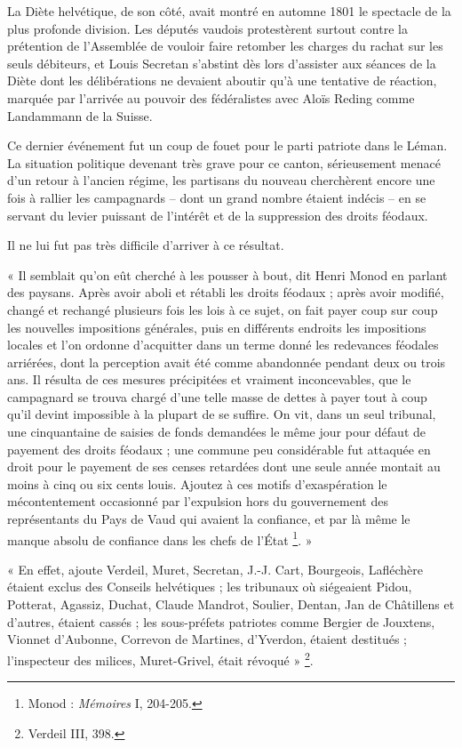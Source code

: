 \documentclass[french,twoside]{book} %
\newenvironment{quoteblock}%
  {\begin{quoting}}
  {\end{quoting}}
\newenvironment{quotebar}{%
    \def\FrameCommand{{\color{rubric!10!}\vrule width 0.5em} \hspace{0.9em}}%
    \def\OuterFrameSep{\itemsep} %
    \MakeFramed {\advance\hsize-\width \FrameRestore}
  }%
  {%
    \endMakeFramed
  }
\renewenvironment{quoteblock}%
  {%
    \savenotes
    \setstretch{0.9}
    \begin{quotebar}
  }
  {%
    \end{quotebar}
    \spewnotes
  }
\begin{document}
\noindent La Diète helvétique, de son côté, avait montré en automne 1801 le spectacle de la plus profonde division. Les députés vaudois protestèrent surtout contre la prétention de l’Assemblée de vouloir faire retomber les charges du rachat sur les seuls débiteurs, et Louis Secretan s’abstint dès lors d’assister aux séances de la Diète dont les délibérations ne devaient aboutir qu’à une tentative de réaction, marquée par l’arrivée au pouvoir des fédéralistes avec Aloïs Reding comme Landammann de la Suisse.\par
Ce dernier événement fut un coup de fouet pour le parti patriote dans le Léman. La situation politique devenant très grave pour ce canton, sérieusement menacé d’un retour à l’ancien régime, les partisans du nouveau cherchèrent encore une fois à rallier les campagnards – dont un grand nombre étaient indécis – en se servant du levier puissant de l’intérêt et de la suppression des droits féodaux.\par
Il ne lui fut pas très difficile d’arriver à ce résultat.\par

\begin{quoteblock}
 \noindent « Il semblait qu’on eût cherché à les pousser à bout, dit Henri Monod en parlant des paysans. Après avoir aboli et rétabli les droits féodaux ; après avoir modifié, changé et rechangé plusieurs fois les lois à ce sujet, on fait payer coup sur coup les nouvelles impositions générales, puis en différents endroits les impositions locales et l’on ordonne d’acquitter dans un terme donné les redevances féodales arriérées, dont la perception avait été comme abandonnée pendant deux ou trois ans. Il résulta de ces mesures précipitées et vraiment inconcevables, que le campagnard se trouva chargé d’une telle masse de dettes à payer tout à coup qu’il devint impossible à la plupart de se suffire. On vit, dans un seul tribunal, une cinquantaine de saisies de fonds demandées le même jour pour défaut de payement des droits féodaux ; une commune peu considérable fut attaquée en droit pour le payement de ses censes retardées dont une seule année montait au moins à cinq ou six cents louis. Ajoutez à ces motifs d’exaspération le mécontentement occasionné par l’expulsion hors du gouvernement des représentants du Pays de Vaud qui avaient la confiance, et par là même le manque absolu de confiance dans les chefs de l’État \footnote{Monod : \emph{Mémoires} I, 204-205.}. »
 \end{quoteblock}


\begin{quoteblock}
 \noindent « En effet, ajoute Verdeil, Muret, Secretan, J.-J. Cart, Bourgeois, Lafléchère étaient exclus des Conseils helvétiques ; les tribunaux où siégeaient Pidou, Potterat, Agassiz, Duchat, Claude Mandrot, Soulier, Dentan, Jan de Châtillens et d’autres, étaient cassés ; les sous-préfets patriotes comme Bergier de Jouxtens, Vionnet d’Aubonne, Correvon de Martines, d’Yverdon, étaient destitués ; l’inspecteur des milices, Muret-Grivel, était révoqué » \footnote{Verdeil III, 398.}.
 \end{quoteblock}
\end{document}
